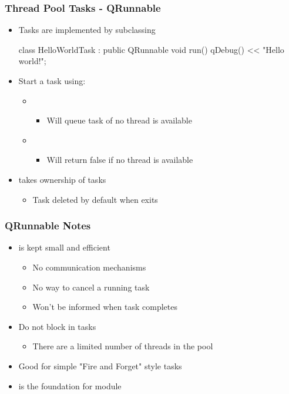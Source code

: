 \begin{slide}[fragile] 
\frametitle{Thread Pool Tasks - QRunnable}

\begin{itemize}
\item Tasks are implemented by subclassing 
\begin{cpp}
class HelloWorldTask : public QRunnable
{
    void run() { qDebug() << "Hello world!"; }
}
\end{cpp}
\item Start a  task using:
  \begin{itemize}
  \item {}
    \begin{itemize}
    \item Will queue task of no thread is available
    \end{itemize}
  \item {}
    \begin{itemize}
    \item Will return false if no thread is available
    \end{itemize}
  \end{itemize}
\item {} takes ownership of  tasks
  \begin{itemize}
  \item Task deleted by default when  exits
  \end{itemize}
\end{itemize}

\end{slide}


\begin{slide}
\frametitle{QRunnable Notes}

\begin{itemize}
\item {} is kept small and efficient
  \begin{itemize}
  \item No communication mechanisms
  \item No way to cancel a running task
  \item Won't be informed when task completes
  \end{itemize}
\item Do not block in tasks
  \begin{itemize}
  \item There are a limited number of threads in the pool
  \end{itemize}
\item Good for simple "Fire and Forget" style tasks
\vspace{1em}
\item {} is the foundation for  module
\end{itemize}

\end{slide}

